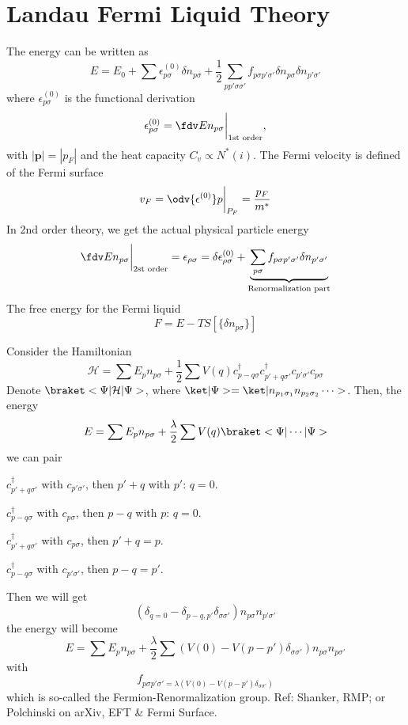 \section{Landau Fermi Liquid Theory}

The energy can be written as
\begin{equation}
  E = E_0 + \sum \epsilon_{p\sigma}^{(0)} \delta n_{p\sigma}
      + \frac12 \sum_{pp'\sigma\sigma'} f_{p\sigma p'\sigma'}
        \delta n_{p\sigma} \delta n_{p'\sigma'}
\end{equation}
where $\epsilon_{p\sigma}^{(0)}$ is the functional derivation
\begin{equation}
  \epsilon_{p\sigma}^{(0)} = \fdv E{n_{p\sigma}} \bigg|_\text{1st order},
\end{equation}
with $|\bm p| = |p_F|$ and the heat capacity $C_v \propto N^*(i)$.
The Fermi velocity is defined of the Fermi surface
\begin{equation}
  v_F = \odv{\epsilon^{(0)}}p \bigg|_{P_F} = \frac{p_F}{m^*}
\end{equation}
In 2nd order theory, we get the actual physical particle energy
\begin{equation}
  \fdv E{n_{p\sigma}} \bigg|_\text{2st order} = \epsilon_{\rho\sigma}
= \delta \epsilon_{\rho\sigma}^{(0)}
+ \underbrace{\sum_{p\sigma} f_{p\sigma p'\sigma'} \delta n_{p'\sigma'}}_
  \text{Renormalization part}
\end{equation}
The free energy for the Fermi liquid
\begin{equation}
  F = E - TS[\{\delta n_{p\sigma}\}]
\end{equation}

\begin{example}
  Consider the Hamiltonian
  \[
    \mathcal H = \sum E_p n_{p\sigma} + \frac12 \sum V(q)
    c_{p-q\sigma}^\dagger c_{p'+q\sigma'}^\dagger
    c_{p'\sigma'} c_{p\sigma}
  \]
  Denote $\braket<\Psi|\mathcal H|\Psi>$, where
  $\ket|\Psi> = \ket|n_{p_1\sigma_1} n_{p_2\sigma_2} \cdots>$.
  Then, the energy
  \[
    E = \sum E_p n_{p\sigma} + \frac\lambda2 \sum V(q) \braket<\Psi|\cdots|\Psi>
  \]
  we can pair
  \begin{enumext}[columns = 2]
    \item $c_{p'+q\sigma'}^\dagger$ with $c_{p'\sigma'}$,
    then $p' + q$ with $p'$: $q = 0$.
    \item $c_{p-q\sigma}^\dagger$ with $c_{p\sigma}$,
    then $p - q$ with $p$: $q = 0$.
    \item $c_{p'+q\sigma'}^\dagger$ with $c_{p\sigma}$,
    then $p' + q = p$.
    \item $c_{p-q\sigma}^\dagger$ with $c_{p'\sigma'}$,
    then $p - q = p'$.
  \end{enumext}
  Then we will get
  \[
    (\delta_{q = 0} - \delta_{p-q,p'} \delta_{\sigma\sigma'})
    n_{p\sigma} n_{p'\sigma'}
  \]
  the energy will become
  \[
    E = \sum E_p n_{p\sigma}
  + \frac\lambda2 \sum (V(0) - V(p - p') \delta_{\sigma\sigma'})
    n_{p\sigma} n_{p\sigma'}
  \]
  with
  \[
    f_{p\sigma p'\sigma' = \lambda(V(0) - V(p - p') \delta_{\sigma\sigma'})}
  \]
  which is so-called the Fermion-Renormalization group.
  Ref: Shanker, RMP; or Polchinski on arXiv, EFT \& Fermi Surface.
\end{example}

